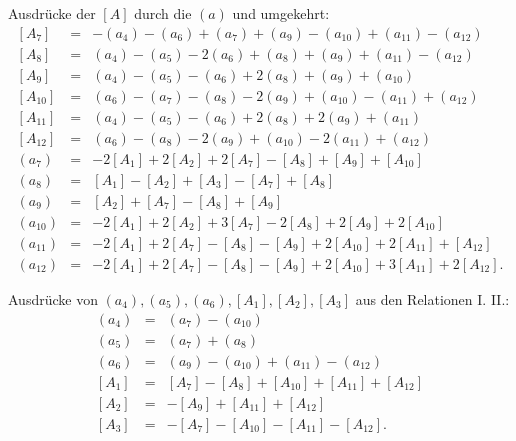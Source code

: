 \documentclass[10pt]{article}
\begin{document}
\noindent Ausdrücke der \([A]\) durch die \((a)\) und umgekehrt:
\[
\begin{array}{rcl}
{}[A_7]&=&-(a_4)-(a_6)+(a_7)+(a_9)-(a_{10})+(a_{11})-(a_{12})\\
{}[A_8]&=&(a_4)-(a_5)-2(a_6)+(a_8)+(a_9)+(a_{11})-(a_{12})\\
{}[A_9]&=&(a_4)-(a_5)-(a_6)+2(a_8)+(a_9)+(a_{10})\\
{}[A_{10}]&=&(a_6)-(a_7)-(a_8)-2(a_9)+(a_{10})-(a_{11})+(a_{12})\\
{}[A_{11}]&=&(a_4)-(a_5)-(a_6)+2(a_8)+2(a_9)+(a_{11})\\
{}[A_{12}]&=&(a_6)-(a_8)-2(a_9)+(a_{10})-2(a_{11})+(a_{12})\\[0.3em]
(a_7)&=&-2[A_1]+2[A_2]+2[A_7]-[A_8]+[A_9]+[A_{10}]\\
(a_8)&=&[A_1]-[A_2]+[A_3]-[A_7]+[A_8]\\
(a_9)&=&[A_2]+[A_7]-[A_8]+[A_9]\\
(a_{10})&=&-2[A_1]+2[A_2]+3[A_7]-2[A_8]+2[A_9]+2[A_{10}]\\
(a_{11})&=&-2[A_1]+2[A_7]-[A_8]-[A_9]+2[A_{10}]+2[A_{11}]+[A_{12}]\\
(a_{12})&=&-2[A_1]+2[A_7]-[A_8]-[A_9]+2[A_{10}]+3[A_{11}]+2[A_{12}].
\end{array}
\]

\noindent Ausdrücke von \((a_4),(a_5),(a_6),[A_1],[A_2],[A_3]\) aus den Relationen I. II.:
\[
\begin{array}{rcl}
(a_4)&=&(a_7)-(a_{10})\\
(a_5)&=&(a_7)+(a_8)\\
(a_6)&=&(a_9)-(a_{10})+(a_{11})-(a_{12})\\
{}[A_1]&=&[A_7]-[A_8]+[A_{10}]+[A_{11}]+[A_{12}]\\
{}[A_2]&=&-[A_9]+[A_{11}]+[A_{12}]\\
{}[A_3]&=&-[A_7]-[A_{10}]-[A_{11}]-[A_{12}].
\end{array}
\]
\end{document}
